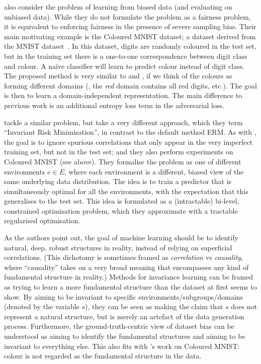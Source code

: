 \citet{kim2019learning} also consider the problem of learning from biased data (and evaluating on unbiased data).
While they do not formulate the problem as a fairness problem,
it is equivalent to enforcing fairness in the presence of severe sampling bias.
Their main motivating example is the Coloured MNIST dataset;
a dataset derived from the MNIST dataset~\citep{lecun1994mnist}.
In this dataset, digits are randomly coloured in the test set,
but in the training set there is a one-to-one correspondence between digit class and colour.
A na\"ive classifier will learn to predict colour instead of digit class.
The proposed method is very similar to \citet{ganin2016domain} and \citet{edwards2016censoring},
if we think of the colours as forming different domains
(\ie, the \emph{red} domain contains all red digits, etc.).
The goal is then to learn a domain-independent representation.
The main difference to previous work is an additional entropy loss term in the adversarial loss.

\citet{arjovsky2019invariant} tackle a similar problem, but take a very different approach,
which they term ``Invariant Risk Minimisation'', in contrast to the default method \acf{ERM}.
As with \citet{kim2019learning},
the goal is to ignore spurious correlations that only appear in the very imperfect training set,
but not in the test set;
and they also perform experiments on Coloured MNIST (see above).
They formalise the problem as one of different environments $e\in E$,
where each environment is a different, biased view of the same underlying data distribution.
The idea is to train a predictor that is simultaneously optimal for all the environments,
with the expectation that this generalises to the test set.
This idea is formulated as a (intractable) bi-level, constrained optimisation problem,
which they approximate with a tractable regularised optimisation.

As the authors point out,
the goal of machine learning should be to identify natural, deep, robust structures in reality,
instead of relying on superficial correlations.
(This dichotomy is sometimes framed as \emph{correlation} vs \emph{causality},
where ``causality'' takes on a very broad meaning that encompasses any kind of fundamental structure in reality.)
Methods for invariance learning can be framed as trying to learn a more fundamental structure
than the dataset at first seems to show.
By aiming to be invariant to specific environments/subgroups/domains (denoted by the variable \(s\)),
they can be seen as making the claim that \(s\) does not represent a natural structure,
but is merely an artefact of the data generation process.
Furthermore, the ground-truth-centric view of dataset bias can be understood as
aiming to identify the fundamental structures and aiming to be invariant to everything else.
This also fits with \citet{kim2019learning}'s work on Coloured MNIST:
colour is not regarded as the fundamental structure in the data.

